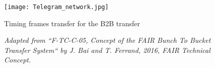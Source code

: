 \begin{landscape}
\begin{figure}[H]
   \centering   
   \texttt{[image: Telegram\_network.jpg]}
   \caption{Timing frames transfer for the B2B transfer}
	\caption*{\textsl{\small{Adapted from ``F-TC-C-05, Concept of the FAIR Bunch To Bucket Transfer System`` by J. Bai and T. Ferrand, 2016, FAIR Technical Concept.}}}
   \label{Telegram_network}
\end{figure}  
\end{landscape}